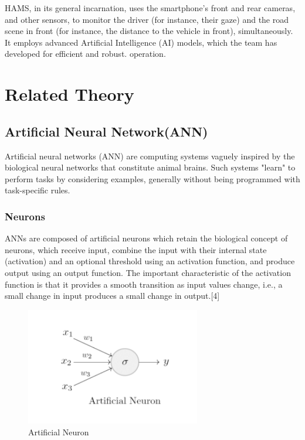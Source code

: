 HAMS, in its general incarnation, uses the smartphone’s front and rear cameras, and other sensors, to monitor the driver (for instance, their gaze) and the road scene in front (for instance, the distance to the vehicle in front), simultaneously. It employs advanced Artificial Intelligence (AI) models, which the team has developed for efficient and robust. operation\cite{bordia2020automated}.


   


\section{Related Theory}
\subsection{Artificial Neural Network(ANN)}
Artificial neural networks (ANN) are computing systems vaguely inspired by the biological neural networks that constitute animal brains. Such systems "learn" to perform tasks by considering examples, generally without being programmed with
task-specific rules\cite{bordia2020automated}.

\subsubsection{Neurons}
ANNs are composed of artificial neurons which retain the biological concept of
neurons, which receive input, combine the input with their internal state
(activation) and an optional threshold using an activation function, and produce
output using an output function. The important characteristic of the activation
function is that it provides a smooth transition as input values change, i.e., a small change in input produces a small change in output.[4]

\begin{figure}[tbh] %
\begin{center}
	\includegraphics[width = 3in]{images/artificialneuron.png}
	\caption{Artificial Neuron} %
	\label{figArtificialNeuron} %
\end{center}
\end{figure}

